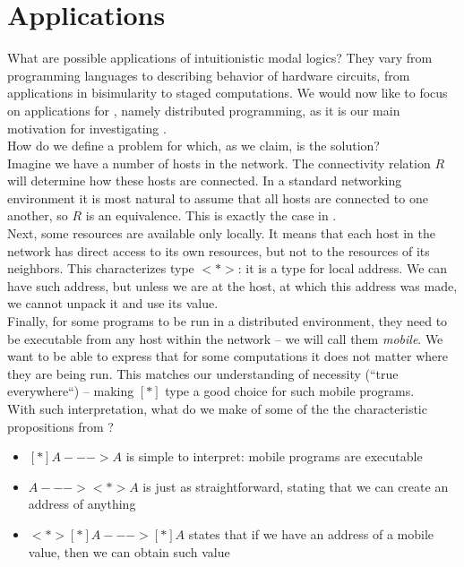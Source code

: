 \section{Applications}

What are possible applications of intuitionistic modal logics? They vary from programming languages to describing behavior of hardware circuits, from applications in bisimularity to staged computations. We would now like to focus on applications for \logic{}, namely distributed programming, as it is our main motivation for investigating \logic{}.\\

How do we define a problem for which, as we claim, \logic{} is the solution?\\
Imagine we have a number of hosts in the network. The connectivity relation $R$ will determine how these hosts are connected. In a standard networking environment it is most natural to assume that all hosts are connected to one another, so $R$ is an equivalence. This is exactly the case in \logic{}.\\
Next, some resources are available only locally. It means that each host in the network has direct access to its own resources, but not to the resources of its neighbors. This characterizes type $<*>$: it is a type for local address. We can have such address, but unless we are at the host, at which this address was made, we cannot unpack it and use its value.\\
Finally, for some programs to be run in a distributed environment, they need to be executable from any host within the network -- we will call them \emph{mobile}. We want to be able to express that for some computations it does not matter where they are being run. This matches our understanding of necessity (``true everywhere``) -- making $[*]$ type a good choice for such mobile programs.\\

With such interpretation, what do we make of some of the the characteristic propositions from \logic{}?
\begin{itemize}
\item[] $[*]A ---> A$ is simple to interpret: mobile programs are executable
\item[] $A ---> <*>A$ is just as straightforward, stating that we can create an address of anything
\item[] $<*>[*]A ---> [*]A$ states that if we have an address of a mobile value, then we can obtain such value
\end{itemize}

